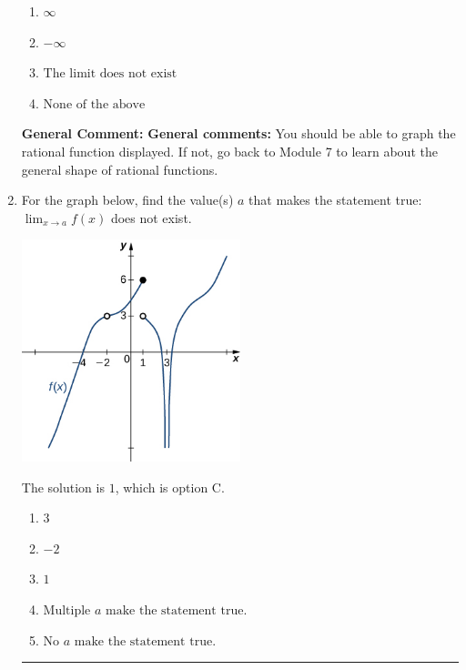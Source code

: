 \documentclass{extbook}[14pt]
\newcommand{\litem}[1]{\item #1

\rule{\textwidth}{0.4pt}}
\begin{document}
\begin{enumerate}
{\begin{enumerate}[label=\Alph*.]
\item \( \infty \)


\item \( -\infty \)


\item \( \text{The limit does not exist} \)


\item \( \text{None of the above} \)


\end{enumerate}

\textbf{General Comment:} \textbf{General comments:} You should be able to graph the rational function displayed. If not, go back to Module 7 to learn about the general shape of rational functions.
}
\litem{
For the graph below, find the value(s) $a$ that makes the statement true: $ \displaystyle \lim_{x \rightarrow a} f(x)$ does not exist.

\begin{center}
    \includegraphics[width=0.5\textwidth]{../Figures/evaluateLimitGraphicallyCopyB.png}
\end{center}




The solution is \( 1 \), which is option C.\begin{enumerate}[label=\Alph*.]
\item \( 3 \)


\item \( -2 \)


\item \( 1 \)


\item \( \text{Multiple } a \text{ make the statement true}. \)


\item \( \text{No } a \text{ make the statement true}. \)


\end{enumerate}

}
\end{enumerate}
\end{document}
